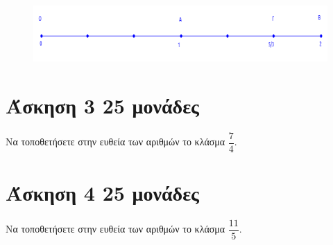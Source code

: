 \documentclass[a4paper,10pt]{report}
\begin{document}
\begin{figure}[ht]
\centering
\label{apotelesmata_sel14}
\includegraphics[scale=1]{theoria1b.png}
\end{figure}


\section*{Άσκηση 3  \hfill \small{25 μονάδες}}
Να τοποθετήσετε στην ευθεία των αριθμών το κλάσμα $\dfrac{7}{4}$.
\section*{Άσκηση 4  \hfill \small{25 μονάδες}}
Να τοποθετήσετε στην ευθεία των αριθμών το κλάσμα $\dfrac{11}{5}$.
\end{document}
